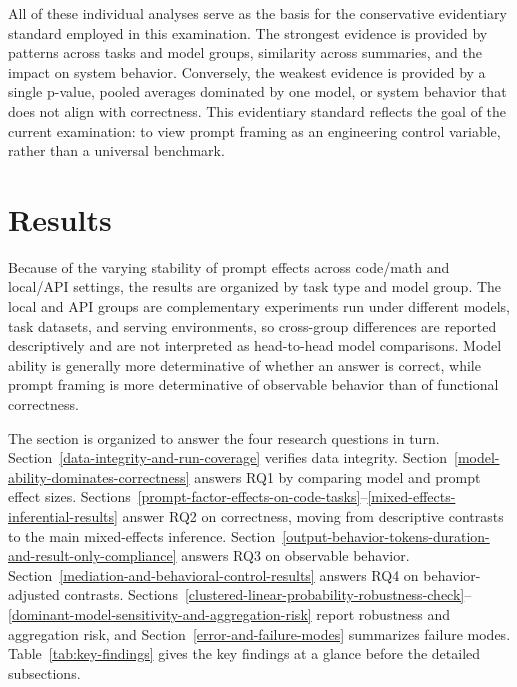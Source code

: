 \documentclass{llncs}
\begin{document}
All of these individual analyses serve as the basis for the conservative evidentiary standard employed in this examination. The strongest evidence is provided by patterns across tasks and model groups, similarity across summaries, and the impact on system behavior. Conversely, the weakest evidence is provided by a single p-value, pooled averages dominated by one model, or system behavior that does not align with correctness. This evidentiary standard reflects the goal of the current examination: to view prompt framing as an engineering control variable, rather than a universal benchmark.

\section{Results}

Because of the varying stability of prompt effects across code/math and local/API settings, the results are organized by task type and model group. The local and API groups are complementary experiments run under different models, task datasets, and serving environments, so cross-group differences are reported descriptively and are not interpreted as head-to-head model comparisons. Model ability is generally more determinative of whether an answer is correct, while prompt framing is more determinative of observable behavior than of functional correctness.

The section is organized to answer the four research questions in turn. Section~\ref{data-integrity-and-run-coverage} verifies data integrity. Section~\ref{model-ability-dominates-correctness} answers RQ1 by comparing model and prompt effect sizes. Sections~\ref{prompt-factor-effects-on-code-tasks}--\ref{mixed-effects-inferential-results} answer RQ2 on correctness, moving from descriptive contrasts to the main mixed-effects inference. Section~\ref{output-behavior-tokens-duration-and-result-only-compliance} answers RQ3 on observable behavior. Section~\ref{mediation-and-behavioral-control-results} answers RQ4 on behavior-adjusted contrasts. Sections~\ref{clustered-linear-probability-robustness-check}--\ref{dominant-model-sensitivity-and-aggregation-risk} report robustness and aggregation risk, and Section~\ref{error-and-failure-modes} summarizes failure modes. Table~\ref{tab:key-findings} gives the key findings at a glance before the detailed subsections.
\end{document}
